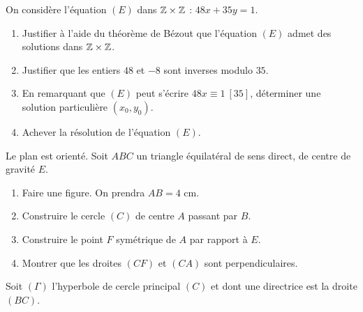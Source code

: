 \documentclass[11pt]{article}
\begin{document}


On considère l'équation $(E)$ dans $\mathbb{Z} \times \mathbb{Z}$ : $48x + 35y = 1$.

\begin{enumerate}[label=\alph*]
  \item Justifier à l'aide du théorème de Bézout que l'équation $(E)$ admet des solutions dans $\mathbb{Z} \times \mathbb{Z}$.
  \item Justifier que les entiers $48$ et $-8$ sont inverses modulo $35$.
  \item En remarquant que $(E)$ peut s'écrire $48x \equiv 1\ [35]$, déterminer une solution particulière $(x_0, y_0)$.
  \item Achever la résolution de l'équation $(E)$.
\end{enumerate}


Le plan est orienté. Soit $ABC$ un triangle équilatéral de sens direct, de centre de gravité $E$.

\begin{enumerate}
  \item Faire une figure. On prendra $AB = 4$ cm.
  \item Construire le cercle $(C)$ de centre $A$ passant par $B$.
  \item Construire le point $F$ symétrique de $A$ par rapport à $E$.
  \item Montrer que les droites $(CF)$ et $(CA)$ sont perpendiculaires.
\end{enumerate}

Soit $(\Gamma)$ l'hyperbole de cercle principal $(C)$ et dont une directrice est la droite $(BC)$.
\end{document}
